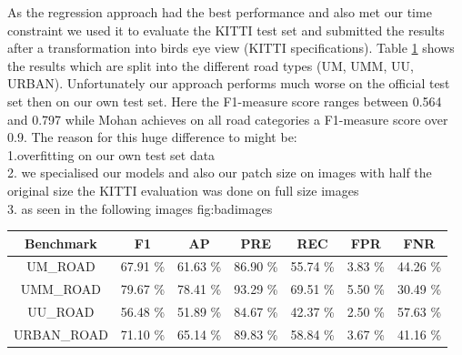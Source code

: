 As the regression approach had the best performance and also met our time constraint we used it to evaluate the KITTI test set and submitted the results after a transformation into birds eye view (KITTI specifications). Table \ref{tab:kitti} shows the results which are split into the different road types (UM, UMM, UU, URBAN).
Unfortunately our approach performs much worse on the official test set then on our own test set. Here the F1-measure score ranges between 0.564 and 0.797 while Mohan achieves on all road categories a F1-measure score over 0.9. The reason for this huge difference to might be: \\
1.overfitting on our own test set data\\
2. we specialised our models and also our patch size on images with half the original size the KITTI evaluation was done on full size images\\
3. as seen in the following images {fig:badimages}

      \begin{table}[h!]
  \begin{center}
  \label{tab:kitti}
\begin{tabular}{c|cccccc}
 {\bf Benchmark} & {\bf F1} & {\bf AP} & {\bf PRE} & {\bf REC} & {\bf FPR} & {\bf FNR}\\ \hline
UM\_ROAD & 67.91 \% & 61.63 \% & 86.90 \% & 55.74 \% & 3.83 \% & 44.26 \%\\
UMM\_ROAD & 79.67 \% & 78.41 \% & 93.29 \% & 69.51 \% & 5.50 \% & 30.49 \%\\
UU\_ROAD & 56.48 \% & 51.89 \% & 84.67 \% & 42.37 \% & 2.50 \% & 57.63 \%\\
URBAN\_ROAD & 71.10 \% & 65.14 \% & 89.83 \% & 58.84 \% & 3.67 \% & 41.16 \%\\
\end{tabular}
  \end{center}
\end{table}




